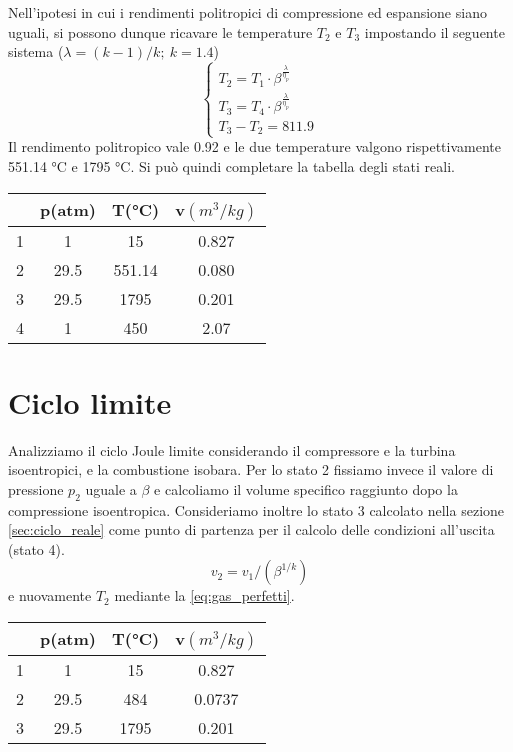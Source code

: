 \documentclass[a4paper,12pt]{article}
\begin{document}
Nell'ipotesi in cui i rendimenti politropici di compressione ed espansione siano uguali, si possono dunque ricavare le temperature $T_2$ e $T_3$ impostando il seguente sistema
($\lambda = (k-1)/k;\ k=1.4$)
$$
\begin{cases}
    T_2 = T_1\cdot\beta^{\frac{\lambda}{\eta_p}} \\
    T_3 = T_4\cdot\beta^{\frac{\lambda}{\eta_p}}\\
    T_3-T_2 = 811.9
\end{cases}
$$
Il rendimento politropico vale 0.92 e le due temperature valgono rispettivamente 551.14 °C e 1795 °C.
Si può quindi completare la tabella degli stati reali.
\begin{center}
    \begin{tabular}{c|c|c|c}
            &p(atm) &T(°C)  &v$(m^3/kg)$     \\ \hline
        1   &    1  & 15    & 0.827   \\
        2   &   29.5&551.14 & 0.080   \\
        3   &   29.5&1795   & 0.201   \\
        4   &   1   & 450   & 2.07
    \end{tabular}
\end{center}

\section{Ciclo limite}
\label{sec:ciclo_limite}
Analizziamo il ciclo Joule limite considerando il compressore e la turbina isoentropici, e la combustione isobara.
Per lo stato 2 fissiamo invece il valore di pressione $p_2$ uguale a $\beta$ e calcoliamo il volume specifico raggiunto dopo la compressione isoentropica.
Consideriamo inoltre lo stato 3 calcolato nella sezione \ref{sec:ciclo_reale} come punto di partenza per il calcolo delle condizioni all'uscita (stato 4).
\begin{equation*}
    v_2 = v_1/(\beta^{1/k})
\end{equation*}
e nuovamente $T_2$ mediante la \eqref{eq:gas_perfetti}.
\begin{center}
    \begin{tabular}{c|c|c|c}
            &p(atm) &T(°C)  &v$(m^3/kg)$     \\ \hline
        1   &    1  & 15    & 0.827   \\
        2   &   29.5& 484   & 0.0737  \\
        3   &   29.5&1795   & 0.201   \\
    \end{tabular}
\end{center}
\end{document}
